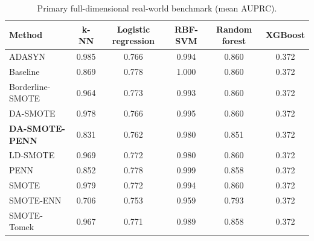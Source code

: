 \begin{table}[htb]
\centering
\caption{Primary full-dimensional real-world benchmark (mean AUPRC).}
\label{tab:main_realworld}
\small
\begin{tabular}{lccccc}
\toprule
Method & k-NN & Logistic regression & RBF-SVM & Random forest & XGBoost
\\
\midrule
ADASYN & 0.985 & 0.766 & 0.994 & 0.860 & 0.372
\\
Baseline & 0.869 & 0.778 & 1.000 & 0.860 & 0.372
\\
Borderline-SMOTE & 0.964 & 0.773 & 0.993 & 0.860 & 0.372
\\
DA-SMOTE & 0.978 & 0.766 & 0.995 & 0.860 & 0.372
\\
\textbf{DA-SMOTE-PENN} & 0.831 & 0.762 & 0.980 & 0.851 & 0.372
\\
LD-SMOTE & 0.969 & 0.772 & 0.980 & 0.860 & 0.372
\\
PENN & 0.852 & 0.778 & 0.999 & 0.858 & 0.372
\\
SMOTE & 0.979 & 0.772 & 0.994 & 0.860 & 0.372
\\
SMOTE-ENN & 0.706 & 0.753 & 0.959 & 0.793 & 0.372
\\
SMOTE-Tomek & 0.967 & 0.771 & 0.989 & 0.858 & 0.372
\\
\bottomrule
\end{tabular}
\end{table}
